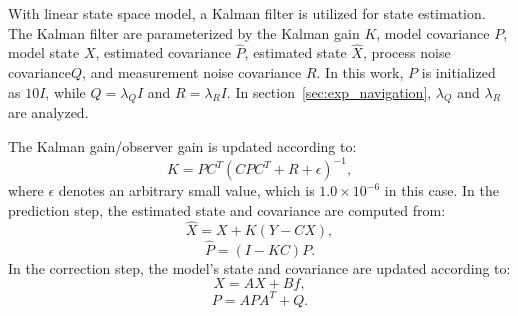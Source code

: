 With linear state space model, a Kalman filter is utilized for state estimation. The Kalman filter are parameterized by the Kalman gain $K$, model covariance $P$, model state $X$, estimated covariance $\hat{P}$, estimated state $\hat{X}$, process noise covariance$Q$, and measurement noise covariance $R$. In this work, $P$ is initialized as $10I$, while $Q = \lambda_Q I$ and $R = \lambda_R I$. In section~\ref{sec:exp_navigation}, $\lambda_Q$ and $\lambda_R$ are analyzed. 

The Kalman gain/observer gain is updated according to:
\begin{equation}
K = P C^T \left( C P C^T + R + \epsilon \right)^{-1},
\label{eq:kalman_gain}
\end{equation}
where $\epsilon$ denotes an arbitrary small value, which is $1.0\times10^{-6}$ in this case. In the prediction step, the estimated state and covariance are computed from:
\begin{equation}
\hat{X} = X + K(Y-CX), 
\label{eq:estimated_state}
\end{equation}
\begin{equation}
\hat{P} = (I - KC) P.
\label{eq:estimated_covar}
\end{equation}
In the correction step, the model's state and covariance are updated according to:
\begin{equation}
X = AX + Bf,
\label{eq:update_state}
\end{equation}
\begin{equation}
P = APA^T + Q.
\label{eq:update_covar}
\end{equation}
